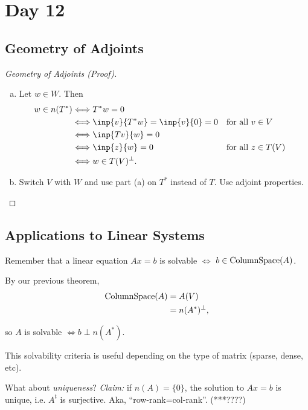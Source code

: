 
\pagebreak
\section{Day 12}

\subsection{Geometry of Adjoints}

\begin{proof}[Geometry of Adjoints (Proof)]
  \begin{enumerate}[(a)]
    \item Let $w\in W$. Then
    \begin{align*}
      w\in n(T^*) &\Longleftrightarrow T^*w=0\\
      &\Longleftrightarrow \inp{v}{T^*w}=\inp{v}{0}=0 &&\text{for all $v\in V$}\\
      &\Longleftrightarrow \inp{Tv}{w}=0\\
      &\Longleftrightarrow \inp{z}{w}=0 &&\text{for all $z\in T(V)$}\\
      &\Longleftrightarrow w\in T(V)^\perp.
    \end{align*}
    \item Switch $V$ with $W$ and use part (a) on $T^*$ instead of $T$. Use adjoint properties.
  \end{enumerate}
\end{proof}


\subsection{Applications to Linear Systems}
Remember that a linear equation $Ax=b$ is solvable $\Longleftrightarrow$ $b\in\operatorname{ColumnSpace}(A)$.

By our previous theorem,
\begin{align*}
  \operatorname{ColumnSpace}(A) &= A(V)\\
  &= n(A^*)^\perp,
\end{align*}

so $A$ is solvable $\Longleftrightarrow b\perp n(A^*)$.

This solvability criteria is useful depending on the type of matrix (sparse, dense, etc).

What about \emph{uniqueness}? \emph{Claim:} if $n(A)=\{0\}$, the solution to $Ax=b$ is unique, i.e. $A^t$ is surjective. Aka, ``row-rank=col-rank''. (***????)


